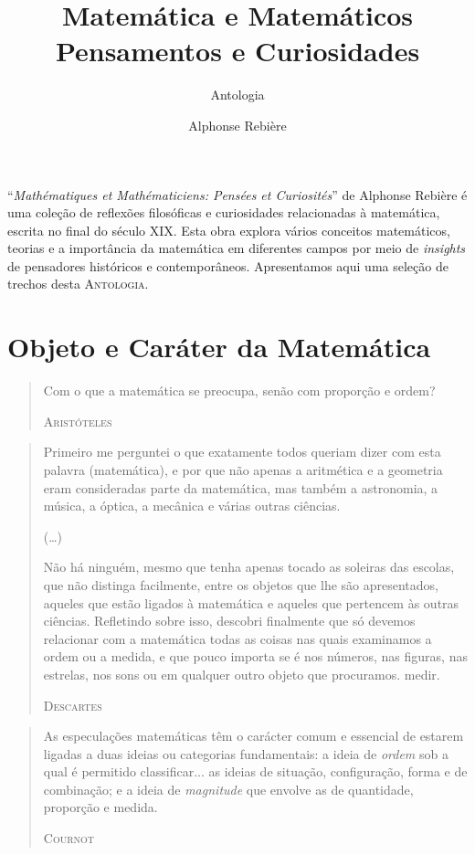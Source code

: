 \documentclass{hipatia}
\title{Matemática e Matemáticos\\
Pensamentos e Curiosidades}
\subtitle{Antologia}
\author{Alphonse Rebière}
\begin{document}
\setcounter{page}{\antologiapage}
\maketitle
``\emph{Mathématiques et Mathématiciens: Pensées et Curiosités}'' de Alphonse Rebière é uma coleção de reflexões filosóficas e curiosidades relacionadas à matemática, escrita no final do século XIX. Esta obra explora vários conceitos matemáticos, teorias e a importância da matemática em diferentes campos por meio de \emph{insights} de pensadores históricos e contemporâneos. 
Apresentamos aqui uma seleção de trechos desta \textsc{Antologia}.


\section{Objeto e Caráter da Matemática}

\begin{quote}
Com o que a matemática se preocupa, senão com proporção e ordem?

\hfill \textsc{Aristóteles}
\end{quote}
 
\begin{quote}
Primeiro me perguntei o que exatamente todos queriam dizer com esta palavra (matemática), e por que não apenas a aritmética e a geometria eram consideradas parte da matemática, mas também a astronomia, a música, a óptica, a mecânica e várias outras ciências.

(\dots)

Não há ninguém, mesmo que tenha apenas tocado as soleiras das escolas, que não distinga facilmente, entre os objetos que lhe são apresentados, aqueles que estão ligados à matemática e aqueles que pertencem às outras ciências. Refletindo sobre isso, descobri finalmente que só devemos relacionar com a matemática todas as coisas nas quais examinamos a ordem ou a medida, e que pouco importa se é nos números, nas figuras, nas estrelas, nos sons ou em qualquer outro objeto que procuramos. medir.

\hfill \textsc{Descartes}
\end{quote}
 
\begin{quote}
As especulações matemáticas têm o carácter comum e essencial de estarem ligadas a duas ideias ou categorias fundamentais: a ideia de \emph{ordem} sob a qual é permitido classificar... as ideias de situação, configuração, forma e de combinação; e a ideia de \emph{magnitude} que envolve as de quantidade, proporção e medida.

\hfill \textsc{Cournot}
\end{quote}
\end{document}
